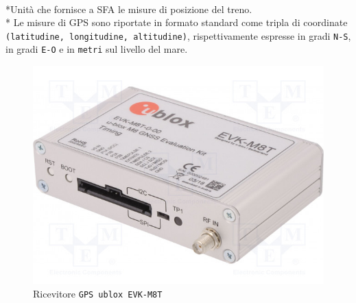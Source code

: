 \begin{itemize}
		\\*Unit\`a che fornisce a SFA le misure di posizione del treno.\\*
Le misure di GPS sono riportate in formato standard come tripla di coordinate \texttt{(latitudine, longitudine, altitudine)}, rispettivamente espresse in gradi \texttt{N-S}, in gradi \texttt{E-O} e in \texttt{metri} sul livello del mare.
\begin{figure}[h]
	\centering
	\includegraphics[scale=0.3]{img/gpsublox}
	\caption{Ricevitore \texttt{GPS ublox EVK-M8T}}
	\label{fig:gpsublox}
\end{figure}
\end{itemize}
